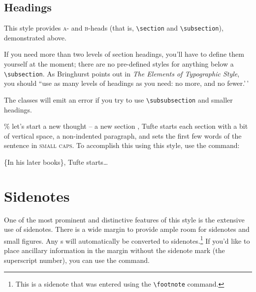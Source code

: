 \documentclass[
  letterpaper,
  DIV=11,
  numbers=noendperiod]{scrartcl}
\begin{document}
\subsection{Headings}\label{sec:headings}

 This style provides \textsc{a}- and \textsc{b}-heads
(that is, \Verb|\section| and \Verb|\subsection|), demonstrated above.

If you need more than two levels of section headings, you'll have to
define them yourself at the moment; there are no pre-defined styles for
anything below a \Verb|\subsection|. As Bringhurst points out in
\textit{The Elements of
Typographic Style},\cite{Bringhurst2005} you should ``use as many levels
of headings as you need: no more, and no fewer.'\,'

The \TL classes will emit an error if you try to use
\linebreak\Verb|\subsubsection| and smaller headings.

\% let's start a new thought -- a new section
,\cite{Tufte2006} Tufte starts each
section with a bit of vertical space, a non-indented paragraph, and sets
the first few words of the sentence in \textsc{small caps}. To
accomplish this using this style, use the 
command:

\begin{docspec}
  \{In his later books\}, Tufte starts\ldots
\end{docspec}

\section{Sidenotes}\label{sec:sidenotes}

One of the most prominent and distinctive features of this style is the
extensive use of sidenotes. There is a wide margin to provide ample room
for sidenotes and small figures. Any s will
automatically be converted to
sidenotes.\footnote{This is a sidenote that was entered
using the \texttt{\textbackslash footnote} command.} If you'd like to
place ancillary information in the margin without the sidenote mark (the
superscript number), you can use the 
command.
\end{document}
